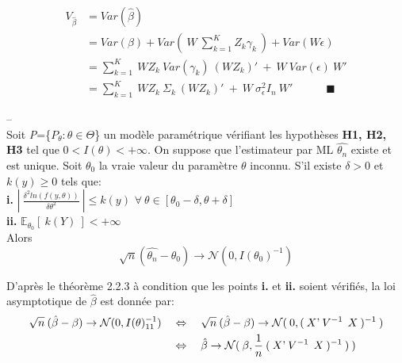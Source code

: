 \documentclass[11pt,fleqn]{book} %
\begin{document}
\begin{align*}
V_{\hat{\beta}} &= Var(\hat{\beta})\\
&=Var(\beta) +  Var(\:W \:\sum_{k=1}^{K} Z_k \gamma_k\:) + Var(W\epsilon)\\
&=\sum_{k=1}^{K} \:W Z_k\: Var(\gamma_k) \: (W Z_k)'\:+\:W \:Var(\epsilon)\: W'\\
&=\sum_{k=1}^{K} \:W Z_k\:\Sigma_k \:(W Z_k)'\:+\:W \: \sigma_{\epsilon}^2 I_n\: W' \quad\quad\quad \blacksquare
\end{align*}

 \vspace{2em}
 
 \begin{theorem}
 --\\
 Soit \textit{P}=\{$P_{\theta} : \theta\in\Theta$\} un modèle paramétrique vérifiant les hypothèses \textbf{H1, H2, H3} tel que $0 <I(\theta)<+\infty$. On suppose que l'estimateur par ML $\hat{\theta_n}$ existe et est unique. Soit $\theta_0$ la vraie valeur du paramètre $\theta$ inconnu. S'il existe $\delta>0$ et $k(y)\geq 0$ tels que:\\
 \textbf{i.} \quad $\left|\: \frac{\delta^2 ln(f(y,\theta))}{\delta\theta^2} \:\right| \leq k(y)$ \quad $\forall\: \theta \in [\theta_0-\delta,\theta+\delta]$\\
 \textbf{ii.} \quad $\mathbb{E}_{\theta_0}[\:k(Y)\:]<+\infty$\\
 Alors\\
 \[
 \sqrt{n}(\hat{\theta_n}-\theta_0)\rightarrow \mathcal{N}(0,I(\theta_0)^{-1})
 \]
 
 \end{theorem}

\vspace{2em}

D'après le théorème 2.2.3 à condition que les points \textbf{i.} et \textbf{ii.} soient vérifiés, la loi asymptotique de $\hat{\beta}$ est donnée par:
\begin{align*}
 \sqrt{n}\:(\hat{\beta}-\beta)\rightarrow \mathcal{N}(0,I(\theta)_{11}^{-1}) \quad
 &\Leftrightarrow \quad \sqrt{n}\:(\hat{\beta}-\beta)\rightarrow \mathcal{N}(\:0,(\:X\textnormal{'} \:V^{-1}\:\: X\:)^{-1}\:)\\
 &\Leftrightarrow \quad \hat{\beta} \rightarrow \mathcal{N}(\:\beta,\frac{1}{n}\:(\:X\textnormal{'} \:V^{-1}\:\: X\:)^{-1}\:)\:)
 \end{align*}

\newpage
\end{document}
